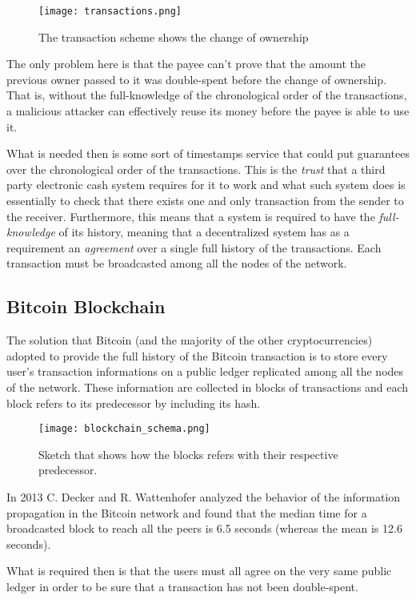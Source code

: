 		\begin{figure}
			\caption{The transaction scheme shows the change of ownership}
			\texttt{[image: transactions.png]}
			\centering	
		\end{figure}
		
		The only problem here is that the payee can't prove that the amount the previous owner passed to it was double-spent before the change of ownership. That is, without the full-knowledge of the chronological order of the transactions, a malicious attacker can effectively reuse its money before the payee is able to use it. 
		
		What is needed then is some sort of timestamps service that could put guarantees over the chronological order of the transactions. This is the \textit{trust} that a third party electronic cash system requires for it to work and what such system does is essentially to check that there exists one and only transaction from the sender to the receiver. Furthermore, this means that a system is required to have the \textit{full-knowledge} of its history, meaning that a decentralized system has as a requirement an \textit{agreement} over a single full history of the transactions. Each transaction must be broadcasted among all the nodes of the network.
		
	\subsection{Bitcoin Blockchain}
		The solution that Bitcoin (and the majority of the other cryptocurrencies) adopted to provide the full history of the Bitcoin transaction is to store every user's transaction informations on a public ledger replicated among all the nodes of the network. These information are collected in blocks of transactions and each block refers to its predecessor by including its hash.
		
		\begin{figure}
			\caption{Sketch that shows how the blocks refers with their respective predecessor.}
			\texttt{[image: blockchain\_schema.png]}
			\centering	
		\end{figure}
	
		In 2013 C. Decker and R. Wattenhofer \cite{Decker2013} analyzed the behavior of the information propagation in the Bitcoin network and found that the median time for a broadcasted block to reach all the peers is 6.5 seconds (whereas the mean is 12.6 seconds).
		
		What is required then is that the users must all agree on the very same public ledger in order to be sure that a transaction has not been double-spent.
		
